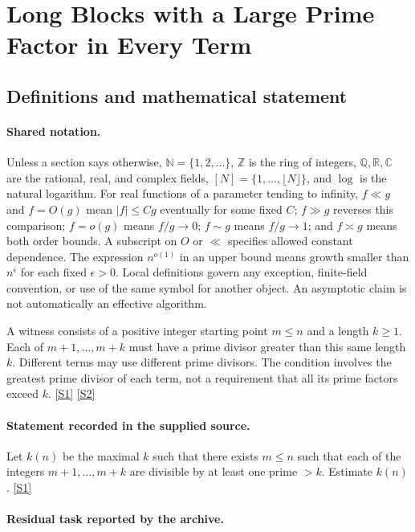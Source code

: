 \documentclass[11pt,a4paper]{article}
\newcommand{\N}{\mathbb{N}}
\newcommand{\Z}{\mathbb{Z}}
\newcommand{\Q}{\mathbb{Q}}
\newcommand{\R}{\mathbb{R}}
\newcommand{\C}{\mathbb{C}}
\newcommand{\sref}[2]{\hyperlink{source:#1:#2}{[S#2]}}
\begin{document}
\section{Long Blocks with a Large Prime Factor in Every Term}\label{statement}


\subsection{Definitions and mathematical statement}

\paragraph{Shared notation.}Unless a section says otherwise, $\N=\{1,2,\ldots\}$,
$\Z$ is the ring of integers, $\Q,\R,\C$ are the rational, real, and complex
fields, $[N]=\{1,\ldots,\lfloor N\rfloor\}$, and $\log$ is the natural
logarithm. For real functions of a parameter tending to infinity,
$f\ll g$ and $f=O(g)$ mean $|f|\leq Cg$ eventually for some fixed $C$;
$f\gg g$ reverses this comparison; $f=o(g)$ means $f/g\to0$;
$f\sim g$ means $f/g\to1$; and $f\asymp g$ means both order bounds.
A subscript on $O$ or $\ll$ specifies allowed constant dependence.
The expression $n^{o(1)}$ in an upper bound means growth smaller than
$n^\epsilon$ for each fixed $\epsilon>0$. Local definitions govern any
exception, finite-field convention, or use of the same symbol for another
object. An asymptotic claim is not automatically an effective algorithm.



A witness consists of a positive integer starting point $m\leq n$ and a length $k\geq1$. Each of $m+1,\ldots,m+k$ must have a prime divisor greater than this same length $k$. Different terms may use different prime divisors. The condition involves the greatest prime divisor of each term, not a requirement that all its prime factors exceed $k$. \sref{statement}{1} \sref{statement}{2}

\paragraph{Statement recorded in the supplied source.}
Let $k(n)$ be the maximal $k$ such that there exists $m\leq n$ such that each of the integers $ m+1,\ldots,m+k $ are divisible by at least one prime $>k$. Estimate $k(n)$. \sref{statement}{1}

\paragraph{Residual task reported by the archive.}
\end{document}
